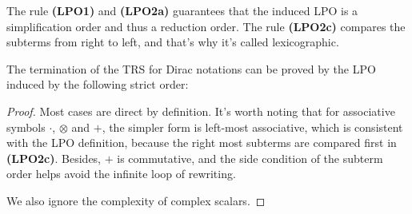 The rule \textbf{(LPO1)} and \textbf{(LPO2a)} guarantees that the induced LPO is a simplification order and thus a reduction order. The rule \textbf{(LPO2c)} compares the subterms from right to left, and that's why it's called lexicographic.

\begin{lemma}
  The termination of the TRS for Dirac notations can be proved by the LPO induced by the following strict order:

  \begin{center}
  \end{center}
\end{lemma}

\begin{proof}
  Most cases are direct by definition. It's worth noting that for associative symbols $\cdot$, $\otimes$ and $+$, the simpler form is left-most associative, which is consistent with the LPO definition, because the right most subterms are compared first in \textbf{(LPO2c)}. Besides, $+$ is commutative, and the side condition of the subterm order helps avoid the infinite loop of rewriting.

  We also ignore the complexity of complex scalars.
\end{proof}




